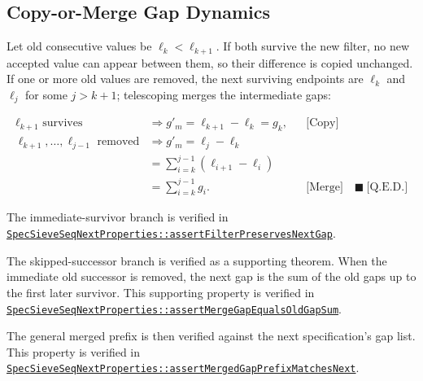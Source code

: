 \subsection{Copy-or-Merge Gap Dynamics}
\label{sec:copy-or-merge-gap-dynamics}

Let old consecutive values be $\ell_k\lt\ell_{k+1}$. If both survive the
new filter, no new accepted value can appear between them, so their
difference is copied unchanged. If one or more old values are removed,
the next surviving endpoints are $\ell_k$ and $\ell_j$ for some $j\gt
k+1$; telescoping merges the intermediate gaps:

\begin{equation*}
\begin{aligned}
\ell_{k+1}\text{ survives}
&\Longrightarrow
g'_m=\ell_{k+1}-\ell_k=g_k,
  &&\text{[Copy]} \\
\ell_{k+1},\ldots,\ell_{j-1}\text{ removed}
&\Longrightarrow
g'_m=\ell_j-\ell_k \\
&=\sum_{i=k}^{j-1}(\ell_{i+1}-\ell_i) \\
&=\sum_{i=k}^{j-1}g_i.
  &&\text{[Merge]}\quad\blacksquare\ \text{[Q.E.D.]}
\end{aligned}
\end{equation*}

{\raggedright
The immediate-survivor branch is verified in
\href{https://github.com/thiagomata/prime-numbers/blob/master/src/main/scala/v1/chapter6/sieve/seq/spec/properties/SpecSieveSeqNextProperties.scala}{\texttt{SpecSieveSeqNextProperties::assertFilterPreservesNextGap}}.
\par}

{\raggedright
The skipped-successor branch is verified as a supporting theorem. When
the immediate old successor is removed, the next gap is the sum of the
old gaps up to the first later survivor. This supporting property is
verified in
\href{https://github.com/thiagomata/prime-numbers/blob/master/src/main/scala/v1/chapter6/sieve/seq/spec/properties/SpecSieveSeqNextProperties.scala}{\texttt{SpecSieveSeqNextProperties::assertMergeGapEqualsOldGapSum}}.
\par}

{\raggedright
The general merged prefix is then verified against the next
specification's gap list. This property is verified in
\href{https://github.com/thiagomata/prime-numbers/blob/master/src/main/scala/v1/chapter6/sieve/seq/spec/properties/SpecSieveSeqNextProperties.scala}{\texttt{SpecSieveSeqNextProperties::assertMergedGapPrefixMatchesNext}}.
\par}

